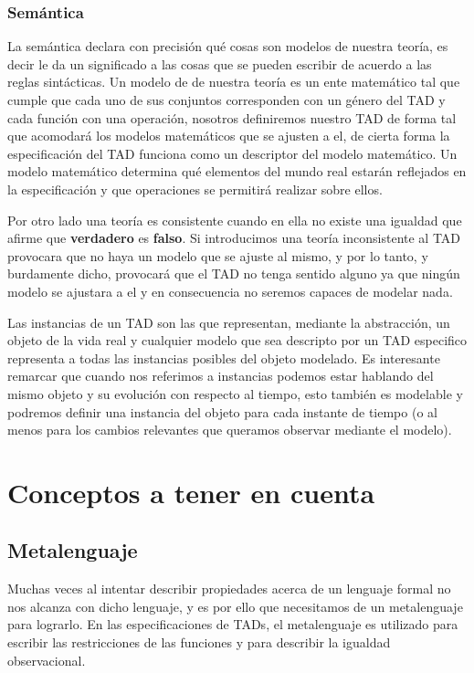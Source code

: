 \subsubsection*{Sem\'antica}

La sem\'antica declara con precisi\'on qu\'e cosas son modelos de nuestra teor\'ia, es decir le da un significado a las cosas que se pueden escribir de acuerdo a las reglas sint\'acticas. Un modelo de de nuestra teor\'ia es un ente matem\'atico tal que cumple que cada uno de sus conjuntos corresponden con un g\'enero del TAD y cada funci\'on con una operaci\'on, nosotros definiremos nuestro TAD de forma tal que acomodar\'a los modelos matem\'aticos que se ajusten a el, de cierta forma la especificaci\'on del TAD funciona como un descriptor del modelo matem\'atico. Un modelo matem\'atico determina qu\'e elementos del mundo real estar\'an reflejados en la especificaci\'on y que operaciones se permitir\'a realizar sobre ellos. 

Por otro lado una teor\'ia es consistente cuando en ella no existe una igualdad que afirme que \textbf{verdadero} es \textbf{falso}. Si introducimos una teor\'ia inconsistente al TAD provocara que no haya un modelo que se ajuste al mismo, y por lo tanto, y burdamente dicho, provocar\'a que el TAD no tenga sentido alguno ya que ning\'un modelo se ajustara a el y en consecuencia no seremos capaces de modelar nada.

Las instancias de un TAD son las que representan, mediante la abstracci\'on, un objeto de la vida real y cualquier modelo que sea descripto por un TAD especifico representa a todas las instancias posibles del objeto modelado. Es interesante remarcar que cuando nos referimos a instancias podemos estar hablando del mismo objeto y su evoluci\'on con respecto al tiempo, esto tambi\'en es modelable y podremos definir una instancia del objeto para cada instante de tiempo (o al menos para los cambios relevantes que queramos observar mediante el modelo).

\section{Conceptos a tener en cuenta}
\subsection{Metalenguaje}

Muchas veces al intentar describir propiedades acerca de un lenguaje formal no nos alcanza con dicho lenguaje, y es por ello que necesitamos de un metalenguaje para lograrlo. En las especificaciones de TADs, el metalenguaje es utilizado para escribir las restricciones de las funciones y para describir la igualdad observacional.

